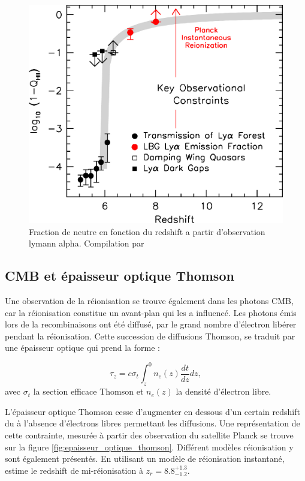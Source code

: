 \begin{figure}
        \includegraphics[width=.95\linewidth]{img/01/xionconstrains.jpg} 
        \caption[Fraction de neutre]{Fraction de neutre en fonction du redshift a partir d'observation lymann alpha.
        Compilation par \cite{2015ApJ...811..140B}}
 		\label{fig:compile_constrains}
\end{figure}


\subsection{CMB et épaisseur optique Thomson}

Une observation de la réionisation se trouve également dans les photons \ac{CMB}, car la réionisation constitue un avant-plan qui les a influencé. 
Les photons émis lors de la recombinaisons ont été diffusé, par le grand nombre d'électron libérer pendant la réionisation.
Cette succession de diffusions Thomson, se traduit par une épaisseur optique qui prend la forme : 

\begin{equation}
\tau_z = c \sigma_t \int_z^0 n_e (z) \frac{dt}{dz} dz,
\end{equation}
avec $\sigma_t$ la section efficace Thomson et $n_e (z)$ la densité d'électron libre.

L'épaisseur optique Thomson cesse d'augmenter en dessous d'un certain redshift du à l’absence d'électrons libres permettant les diffusions.
Une représentation de cette contrainte, mesurée à partir des observation du satellite Planck se trouve sur la figure \ref{fig:epaisseur_optique_thomson}.
Différent modèles réionisation y sont également présentés.
En utilisant un modèle de réionisation instantané, \cite{planck_collaboration_planck_2016} estime le redshift de mi-réionisation à $z_r = 8.8 ^{+1.3}_{-1.2}$.

